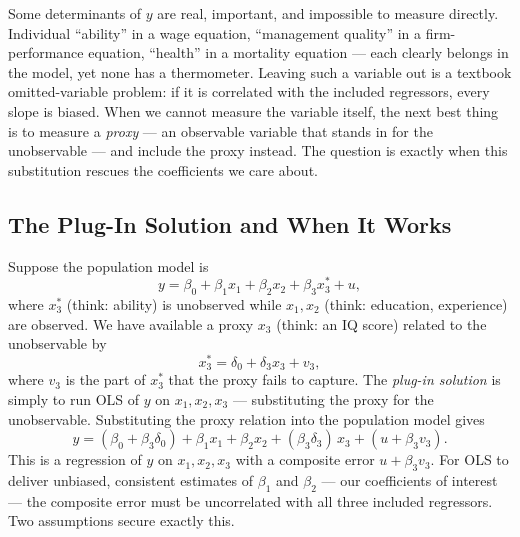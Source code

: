 Some determinants of $y$ are real, important, and impossible to measure directly. Individual ``ability'' in a wage equation, ``management quality'' in a firm-performance equation, ``health'' in a mortality equation --- each clearly belongs in the model, yet none has a thermometer. Leaving such a variable out is a textbook omitted-variable problem: if it is correlated with the included regressors, every slope is biased. When we cannot measure the variable itself, the next best thing is to measure a \emph{proxy} --- an observable variable that stands in for the unobservable --- and include the proxy instead. The question is exactly when this substitution rescues the coefficients we care about.

\subsection{The Plug-In Solution and When It Works}

Suppose the population model is
\[
y = \beta_0 + \beta_1 x_1 + \beta_2 x_2 + \beta_3 x_3^* + u,
\]
where $x_3^*$ (think: ability) is unobserved while $x_1,x_2$ (think: education, experience) are observed. We have available a proxy $x_3$ (think: an IQ score) related to the unobservable by
\[
x_3^* = \delta_0 + \delta_3 x_3 + v_3,
\]
where $v_3$ is the part of $x_3^*$ that the proxy fails to capture. The \emph{plug-in solution} is simply to run OLS of $y$ on $x_1, x_2, x_3$ --- substituting the proxy for the unobservable. Substituting the proxy relation into the population model gives
\[
y = (\beta_0 + \beta_3 \delta_0) + \beta_1 x_1 + \beta_2 x_2 + (\beta_3 \delta_3)\, x_3 + (u + \beta_3 v_3).
\]
This is a regression of $y$ on $x_1, x_2, x_3$ with a composite error $u+\beta_3 v_3$. For OLS to deliver unbiased, consistent estimates of $\beta_1$ and $\beta_2$ --- our coefficients of interest --- the composite error must be uncorrelated with all three included regressors. Two assumptions secure exactly this.


